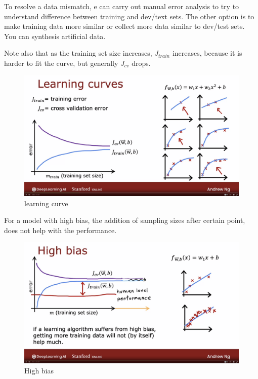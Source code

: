 \documentclass[12pt]{report}
\begin{document}
To resolve a data mismatch, e can carry out manual error analysis to try to understand difference between training and dev/text sets. The other option is to make training data more similar or collect more data similar to dev/test sets. You can synthesis artificial data.

Note also that as the training set size increases, $J_{train}$ increases, because it is harder to fit the curve, but generally $J_{cv}$ drops.

\begin{figure}[H]
  \centering
  \includegraphics[trim =0.0cm 0.0cm 0.0cm 0.0cm, clip, scale=0.12]{pics/LearningCurve.png}
  \caption{learning curve}
\end{figure}

For a model with high bias, the addition of sampling sizes after certain point, does not help with the performance.

\begin{figure}[H]
  \centering
  \includegraphics[trim =0.0cm 0.0cm 0.0cm 0.0cm, clip, scale=0.12]{pics/highBias.png}
  \caption{High bias}
\end{figure}
\end{document}

